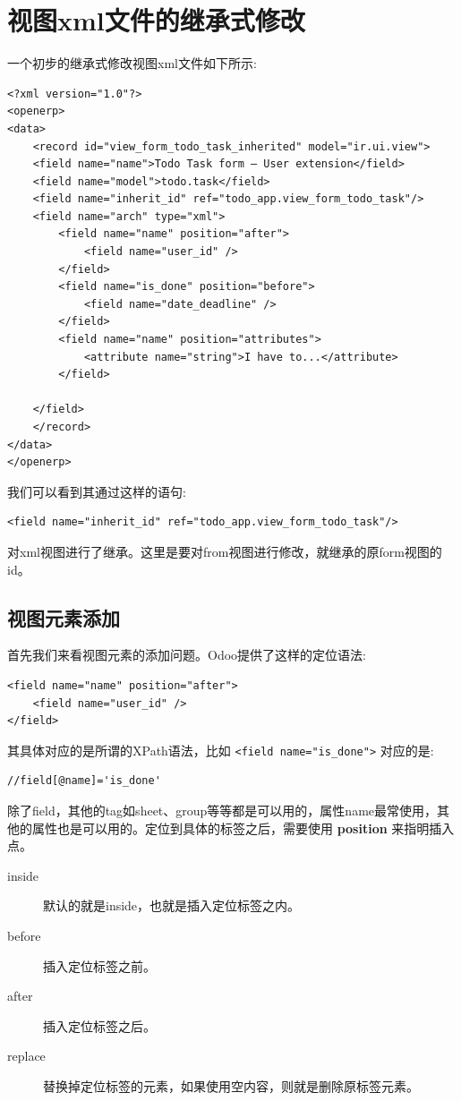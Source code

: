 \documentclass[11pt,a4paper]{sphinxmanual}
\begin{document}
\section{视图xml文件的继承式修改}
\label{sec-8-4}
一个初步的继承式修改视图xml文件如下所示:
\begin{verbatim}
<?xml version="1.0"?>
<openerp>
<data>
    <record id="view_form_todo_task_inherited" model="ir.ui.view">
    <field name="name">Todo Task form – User extension</field>
    <field name="model">todo.task</field>
    <field name="inherit_id" ref="todo_app.view_form_todo_task"/>
    <field name="arch" type="xml">
        <field name="name" position="after">
            <field name="user_id" />
        </field>
        <field name="is_done" position="before">
            <field name="date_deadline" />
        </field>
        <field name="name" position="attributes">
            <attribute name="string">I have to...</attribute>
        </field>

    </field>
    </record>
</data>
</openerp>
\end{verbatim}

我们可以看到其通过这样的语句:
\begin{Verbatim}
<field name="inherit_id" ref="todo_app.view_form_todo_task"/>
\end{Verbatim}

对xml视图进行了继承。这里是要对from视图进行修改，就继承的原form视图的id。

\subsection{视图元素添加}
\label{sec-8-4-1}
首先我们来看视图元素的添加问题。Odoo提供了这样的定位语法:
\begin{Verbatim}
<field name="name" position="after">
    <field name="user_id" />
</field>
\end{Verbatim}

其具体对应的是所谓的XPath语法，比如 \verb~<field name="is_done">~ 对应的是:
\begin{Verbatim}
//field[@name]='is_done'
\end{Verbatim}

除了field，其他的tag如sheet、group等等都是可以用的，属性name最常使用，其他的属性也是可以用的。定位到具体的标签之后，需要使用 \textbf{position} 来指明插入点。

\begin{description}
\item[{inside}] 默认的就是inside，也就是插入定位标签之内。
\item[{before}] 插入定位标签之前。
\item[{after}] 插入定位标签之后。
\item[{replace}] 替换掉定位标签的元素，如果使用空内容，则就是删除原标签元素。
\end{description}
\end{document}
